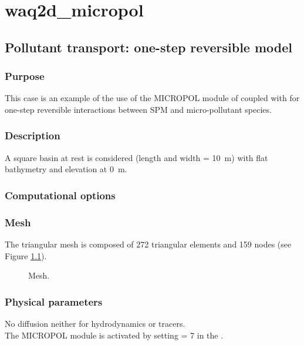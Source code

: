 \chapter{waq2d\_micropol}

\section{Pollutant transport: one-step reversible model}

\subsection{Purpose}

This case is an example of the use of the MICROPOL module of \waqtel
coupled with  for one-step reversible interactions between SPM and
micro-pollutant species.

\subsection{Description}

A square basin at rest is considered (length and width = 10~m)
with flat bathymetry and elevation at 0~m.

\subsection{Computational options}

\subsection{Mesh}

The triangular mesh is composed of 272 triangular elements and 159 nodes
(see Figure \ref{fig:waq2d_micropol:pol_mesh}).

\begin{figure}[H]
 \centering
\caption{Mesh.}
 \label{fig:waq2d_micropol:pol_mesh}
\end{figure}

\subsection{Physical parameters}
No diffusion neither for hydrodynamics or tracers.\\
The MICROPOL module is activated by setting  = 7
in the  .\\

